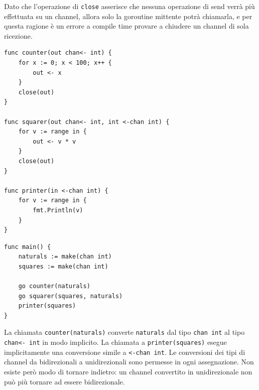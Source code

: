 Dato che l'operazione di \verb|close| asserisce che nessuna operazione di send verrà più effettuata su un channel, allora solo la goroutine mittente potrà chiamarla, e per questa ragione è un errore a compile time provare a chiudere un channel di sola ricezione.
\begin{lstlisting}[frame=single, label={lst:lstlisting7-4-3.2}]
func counter(out chan<- int) {
    for x := 0; x < 100; x++ {
        out <- x
    }
    close(out)
}

func squarer(out chan<- int, int <-chan int) {
    for v := range in {
        out <- v * v
    }
    close(out)
}

func printer(in <-chan int) {
    for v := range in {
        fmt.Println(v)
    }
}
\end{lstlisting}
\begin{lstlisting}[frame=single, label={lst:lstlisting7-4-3.3}]
func main() {
    naturals := make(chan int)
    squares := make(chan int)

    go counter(naturals)
    go squarer(squares, naturals)
    printer(squares)
}
\end{lstlisting}
La chiamata \verb|counter(naturals)| converte \verb|naturals| dal tipo \verb|chan int| al tipo \verb|chan<- int| in modo implicito.
La chiamata a \verb|printer(squares)| esegue implicitamente una conversione simile a \verb|<-chan int|.
Le conversioni dei tipi di channel da bidirezionali a unidirezionali sono permesse in ogni assegnazione.
Non esiste però modo di tornare indietro: un channel convertito in unidirezionale non può più tornare ad essere bidirezionale.

